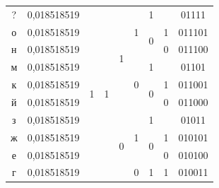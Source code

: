 \documentclass[a4paper,14pt]{extarticle}
\begin{document}
\begin{center}
\begin{tabular}{|c|c|c|c|c|c|c|c|c|}
        \hline
        ?                       & 0,018518519                  & \multirow{28}{*}{1}         & \multirow{13}{*}{1}  & \multirow{6}{*}{1} & \multirow{3}{*}{1} & 1                  &    & 01111  \\
        \cline{1-2} \cline{7-9}
        о                       & 0,018518519                  &                             &                      &                    &                    & \multirow{2}{*}{0} & 1  & 011101 \\
        \cline{1-2} \cline{8-9}
        н                       & 0,018518519                  &                             &                      &                    &                    &                    & 0  & 011100 \\
        \cline{1-2} \cline{6-9}
        м                       & 0,018518519                  &                             &                      &                    & \multirow{3}{*}{0} & 1                  &    & 01101  \\
        \cline{1-2} \cline{7-9}
        к                       & 0,018518519                  &                             &                      &                    &                    & \multirow{2}{*}{0} & 1  & 011001 \\
        \cline{1-2} \cline{8-9}
        й                       & 0,018518519                  &                             &                      &                    &                    &                    & 0  & 011000 \\
        \cline{1-2} \cline{5-9}
        з                       & 0,018518519                  &                             &                      & \multirow{7}{*}{0} & \multirow{3}{*}{1} & 1                  &    & 01011  \\
        \cline{1-2} \cline{7-9}
        ж                       & 0,018518519                  &                             &                      &                    &                    & \multirow{2}{*}{0} & 1  & 010101 \\
        \cline{1-2} \cline{8-9}
        е                       & 0,018518519                  &                             &                      &                    &                    &                    & 0  & 010100 \\
        \cline{1-2} \cline{6-9}
        г                       & 0,018518519                  &                             &                      &                    & \multirow{4}{*}{0} & \multirow{2}{*}{1} & 1  & 010011 \\

\end{tabular}
\end{center}
\end{document}
